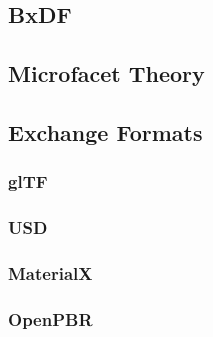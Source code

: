 \subsection{BxDF}
\subsection{Microfacet Theory}
\subsection{Exchange Formats}
\subsubsection{glTF}
\subsubsection{USD}

\subsubsection{MaterialX}
\subsubsection{OpenPBR}
